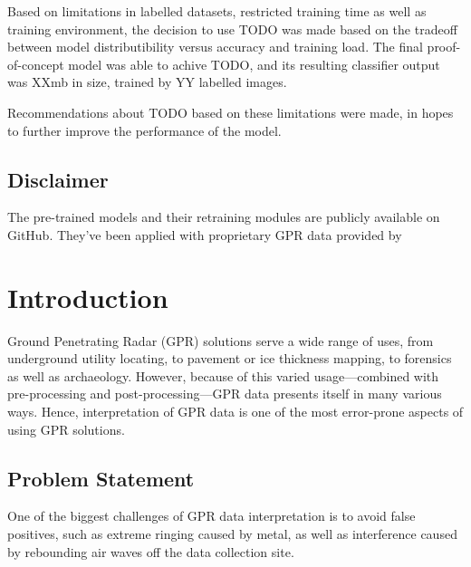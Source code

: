 \documentclass[se,blockletter]{uw-wkrpt}
\begin{document}
Based on limitations in labelled datasets, restricted training time as well as training environment, the decision to use TODO was made based on the tradeoff between model distributibility versus accuracy and training load. The final proof-of-concept model was able to achive TODO, and its resulting classifier output was XXmb in size, trained by YY labelled images.

Recommendations about TODO based on these limitations were made, in hopes to further improve the performance of the model. 

\subsection{Disclaimer}
The pre-trained models and their retraining modules are publicly available on GitHub. They've been applied with proprietary GPR data provided by \thecompany{}  

\tableofcontents
\listoffigures

\mainmatter

\section{Introduction}\label{sec:intro}
Ground Penetrating Radar (GPR) solutions serve a wide range of uses, from underground utility locating, to pavement or ice thickness mapping, to forensics as well as archaeology. However, because of this varied usage---combined with pre-processing and post-processing---GPR data presents itself in many various ways. Hence, interpretation of GPR data is one of the most error-prone aspects of using GPR solutions.

\subsection{Problem Statement}
One of the biggest challenges of GPR data interpretation is to avoid false positives, such as extreme ringing caused by metal, 
as well as interference caused by rebounding air waves off the data collection site.
\end{document}
